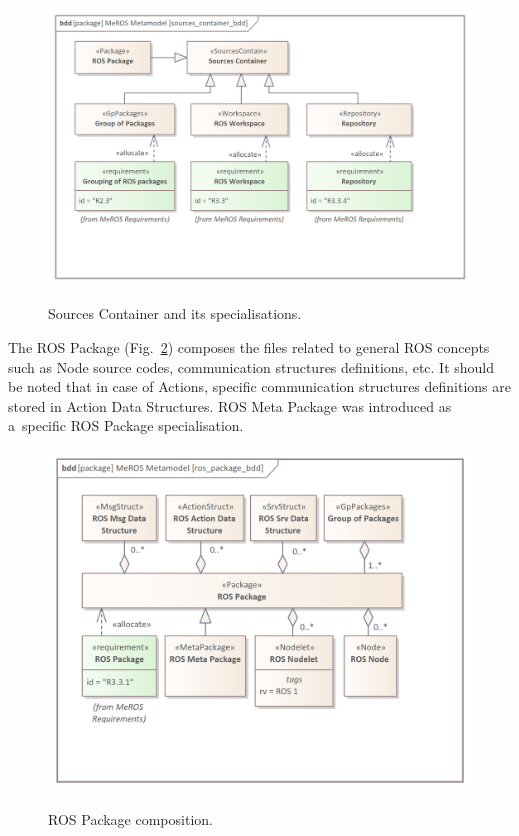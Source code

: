 \documentclass[11pt,oneside,a4paper]{report}
\begin{document}
	
	\begin{figure}[H]
		\centering
		\begin{center}
			{\includegraphics[scale=1.0]{img/meros_pkg/sources_container_bdd.png}}
		\end{center}
		\caption{Sources Container and its specialisations.} 
		\label{fig:sources_container_bdd}
	\end{figure}
	
	The ROS Package (Fig.~\ref{fig:ros_package_bdd}) composes the files related to general ROS concepts such as Node source codes, communication structures definitions, etc. It should be noted that in case of Actions, specific communication structures definitions are stored in Action Data Structures. ROS Meta Package was introduced as a~specific ROS Package specialisation.
	
	\begin{figure}[H]
		\centering
		\begin{center}
			{\includegraphics[scale=1.0]{img/meros_pkg/ros_package_bdd.png}}
		\end{center}
		\caption{ROS Package composition.} 
		\label{fig:ros_package_bdd}
	\end{figure}
		
\end{document}
